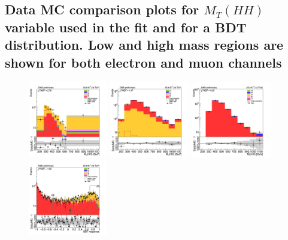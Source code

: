 \subsection{Data MC comparison plots for $M_{T}(HH)$ variable used in the fit and for a BDT distribution. Low and high mass regions are shown for both electron and muon channels}

\begin{figure}[tbp]
  \begin{center}
    \includegraphics[width=0.31\textwidth]{figures/mm_300_july20/hhMt_mm_SR_FullPostfit_plot_july20.png}
    \includegraphics[width=0.31\textwidth]{figures/mm_300_july20/hhMt_mm_CRDY_FullPostfit_plot_july20.png}
    \includegraphics[width=0.31\textwidth]{figures/mm_300_july20/hhMt_mm_CRTT_FullPostfit_plot_july20.png}\\
    \includegraphics[width=0.31\textwidth]{figures/mm_300_july20/bdt_response_mm_SR_FullPostfit_plot_july20.png}

\end{center}
\end{figure}
